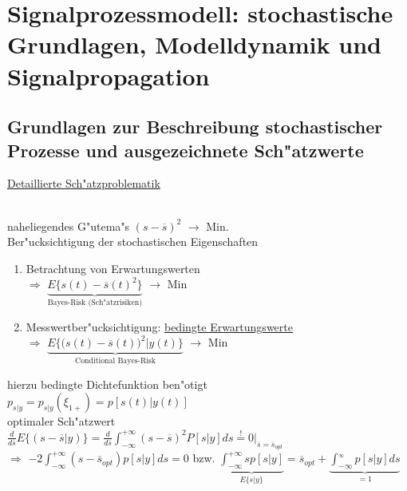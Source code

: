 \documentclass[openany,a4paper,11pt]{book}
\begin{document}
\section{Signalprozessmodell: stochastische Grundlagen, Modelldynamik und Signalpropagation}
\subsection{Grundlagen zur Beschreibung stochastischer Prozesse und ausgezeichnete Sch"atzwerte}
\uline{Detaillierte Sch"atzproblematik}\\
\\
naheliegendes G"utema"s $(s-\overline{s})^2$ $\rightarrow$ Min.\\
Ber"ucksichtigung der stochastischen Eigenschaften\begin{enumerate}
    \item Betrachtung von Erwartungswerten\\
    $\Rightarrow$ $\underbrace{E\{s(t)-\overline{s}(t)^2\}}_{\text{Bayes-Risk (Sch"atzrisiken)}}$ $\rightarrow$ Min
    \item Messwertber"ucksichtigung: \uline{bedingte Erwartungswerte}\\
    $\Rightarrow$ $\underbrace{E\{\Big(s(t)-\overline{s}(t)\Big)^2|y(t)\}}_{\text{Conditional Bayes-Risk}}$ $\rightarrow$ Min
\end{enumerate}
hierzu bedingte Dichtefunktion ben"otigt\\
$p_{s|y}=p_{s|y}(\xi_{1+})=p[s(t)|y(t)]$ \\
optimaler Sch"atzwert\\
$\displaystyle\frac{d}{d\overline{s}}E\{(s-\overline{s}|y)\}=\frac{d}{d\overline{s}}\int_{-\infty}^{+\infty}(s-\overline{s})^2P[s|y]ds\stackrel{!}{=}0\bigg|_{\overline{s}=\overline{s}_{opt}}$\\
$\Rightarrow$ $\displaystyle-2\int_{-\infty}^{+\infty}(s-\overline{s}_{opt})p[s|y]ds=0$ bzw. $\displaystyle\underbrace{\int_{-\infty}^{+\infty}sp[s|y]}_{E\{s|y\}}=\overline{s}_{opt}+\underbrace{\int_{-\infty}^{_\infty}p[s|y]ds}_{=1}$\\
\end{document}
